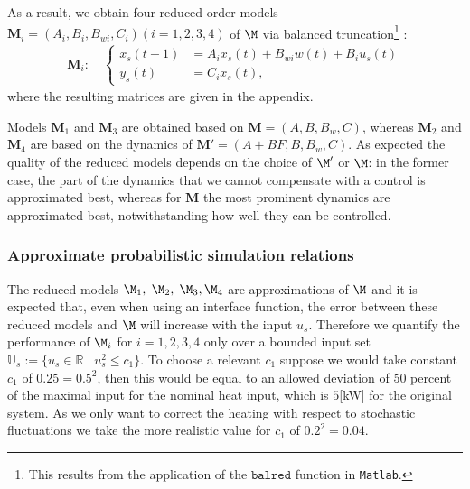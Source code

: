 \documentclass[letterpaper, 10 pt, conference]{amsart}
\theoremstyle{definition}
\theoremstyle{example}
\theoremstyle{remark}
\begin{document}
As a result, we obtain four reduced-order models $\mathbf M_{i}=(A_{i},B_{i},B_{wi},C_{i}) (i=1,2,3,4)$ of $\M$  via balanced truncation\footnote{This results from the application of the 
$\texttt{balred}$ function in \texttt{Matlab}.} : 
 \begin{align}\mathbf M_{i} :\quad\left\{\begin{array}{ll}
x_{s}(t+1)&=A_{i} x_{s}(t)+ B_{wi}w(t)+B_{i} u_{s}(t)\\
y_{s}(t)&= C_{i} x_{s}(t),\end{array}\right.
\end{align}
where the resulting matrices are given in the appendix. 

Models $\mathbf M_{1}$ and $\mathbf M_{3}$ are obtained based on $\mathbf M=(A,B,B_w,C)$, 
whereas  $\mathbf M_{2}$ and $\mathbf M_{4}$ are based on the dynamics of $\mathbf M'=(A+BF,B,B_w,C)$. 
As expected the quality of the reduced models depends on the choice of $\M'$ or $\M$: 
in the former case, the part of the dynamics that we cannot compensate with a control is approximated best,
whereas for $\mathbf M$ the most prominent dynamics are approximated best,  
notwithstanding how well they can be controlled.  


\subsubsection*{Approximate probabilistic simulation relations}
The reduced models $\M_1,$ $\M_2,$ $\M_3,\M_4$ are approximations of $\M$ and it is expected that, even when using an interface function, the error between these reduced models and $\M$ will increase with the input $u_s$. 
Therefore we quantify the performance of $\M_i$ for $i=1,2,3,4$ only over a bounded input set  $\mathbb U_s:= \{u_s\in \mathbb R\mid  u_s^2\leq c_1 \}$.
To choose a relevant $c_1$ suppose we would take constant  $c_1$ of $0.25=0.5^2$, then this would be equal to an allowed deviation of 50 percent of the maximal input for the nominal heat input, which is $5$[kW] for the original system. As we only want to correct the heating with respect to stochastic fluctuations we take the more realistic value for $c_1$ of $0.2^2=0.04$. 
\end{document}
